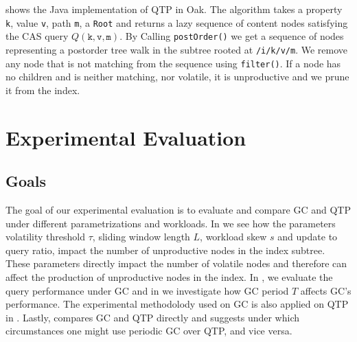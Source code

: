 \documentclass[abstracton,12pt]{scrartcl}
\theoremstyle{definition}
\begin{document}
\vspace{-0.2cm}

 shows the Java implementation of QTP in Oak. The algorithm
takes a property \texttt{k}, value \texttt{v}, path \texttt{m}, a
\texttt{Root} and returns a lazy sequence of content nodes satisfying
the CAS query $Q(\texttt{k},\texttt{v},\texttt{m})$. By Calling
\texttt{postOrder()} we get a sequence of nodes representing a
postorder tree walk in the subtree rooted at \texttt{/i/k/v/m}. We remove any
node that is not
matching from the sequence using \texttt{filter()}. If a node has no children
and is neither matching,
nor volatile, it is unproductive and we prune it from the index.

\newpage

\section{Experimental Evaluation}

\label{sec:experimental-evaluation}

\subsection{Goals}

The goal of our experimental evaluation is to evaluate and 
compare GC and QTP under different parametrizations and workloads.
In  we
see how the parameters volatility threshold $\tau$, sliding window length $L$,
workload skew $s$ and update to query ratio, impact the number of unproductive
nodes in the index subtree.
These parameters directly impact the number of volatile nodes and therefore can affect
the production of unproductive nodes in the index.
In , we evaluate the query performance under GC and in
 we investigate how GC period $T$ affects GC's performance.
The experimental methodolody used on GC is also applied on QTP in .
Lastly,  compares GC and QTP directly and suggests under which
circumstances one might use periodic GC over QTP, and vice versa.
\end{document}
